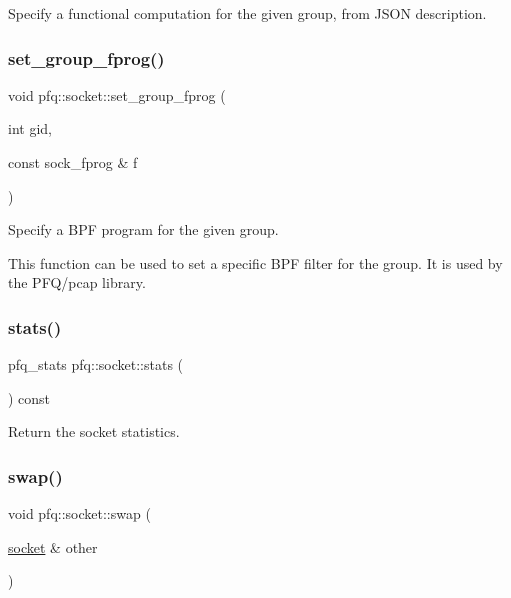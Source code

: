 Specify a functional computation for the given group, from J\+S\+ON description. 

\mbox{\label{classpfq_1_1socket_ad618894910a12a08eaed3d8668db25af}} 
\subsubsection{\texorpdfstring{set\+\_\+group\+\_\+fprog()}{set\_group\_fprog()}}
{\footnotesize\ttfamily void pfq\+::socket\+::set\+\_\+group\+\_\+fprog (\begin{DoxyParamCaption}\item[{int}]{gid,  }\item[{const sock\+\_\+fprog \&}]{f }\end{DoxyParamCaption})\hspace{0.3cm}{\ttfamily [inline]}}



Specify a B\+PF program for the given group. 

This function can be used to set a specific B\+PF filter for the group. It is used by the P\+F\+Q/pcap library. \mbox{\label{classpfq_1_1socket_a00e21405b0711ce7bb7a202f66487cb9}} 
\subsubsection{\texorpdfstring{stats()}{stats()}}
{\footnotesize\ttfamily pfq\+\_\+stats pfq\+::socket\+::stats (\begin{DoxyParamCaption}{ }\end{DoxyParamCaption}) const\hspace{0.3cm}{\ttfamily [inline]}}



Return the socket statistics. 

\mbox{\label{classpfq_1_1socket_ac80ebddf3a94f7964c74bf02954704ce}} 
\subsubsection{\texorpdfstring{swap()}{swap()}}
{\footnotesize\ttfamily void pfq\+::socket\+::swap (\begin{DoxyParamCaption}\item[{\hyperlink{classpfq_1_1socket}{socket} \&}]{other }\end{DoxyParamCaption})\hspace{0.3cm}{\ttfamily [inline]}}



